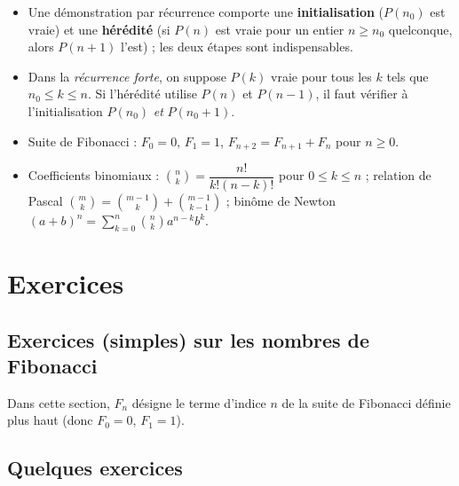 \documentclass[11pt]{article}
\begin{document}
\begin{retenir}
\begin{itemize}
  \item Une démonstration par récurrence comporte une \textbf{initialisation} (\(P(n_0)\) est vraie) et une \textbf{hérédité} (si \(P(n)\) est vraie pour un entier \(n \geq n_0\) quelconque, alors \(P(n+1)\) l'est) ; les deux étapes sont indispensables.
  \item Dans la \emph{récurrence forte}, on suppose \(P(k)\) vraie pour tous les \(k\) tels que \(n_0 \leq k \leq n\). Si l'hérédité utilise \(P(n)\) et \(P(n-1)\), il faut vérifier à l'initialisation \(P(n_0)\) \emph{et} \(P(n_0+1)\).
  \item Suite de Fibonacci : \(F_0 = 0\), \(F_1 = 1\), \(F_{n+2} = F_{n+1} + F_n\) pour \(n \geq 0\).
  \item Coefficients binomiaux : \(\binom{n}{k} = \dfrac{n!}{k!(n-k)!}\) pour \(0 \leq k \leq n\) ; relation de Pascal \(\binom{m}{k} = \binom{m-1}{k} + \binom{m-1}{k-1}\) ; binôme de Newton \((a + b)^n = \sum_{k=0}^n \binom{n}{k} a^{n-k} b^k\).
\end{itemize}
\end{retenir}

\section{Exercices}\label{sec:exercices}

\subsection*{Exercices (simples) sur les nombres de Fibonacci}

Dans cette section, \(F_n\) désigne le terme d'indice \(n\) de la suite de Fibonacci définie plus haut (donc \(F_0 = 0\), \(F_1 = 1\)).


\subsection*{Quelques exercices}
\end{document}
